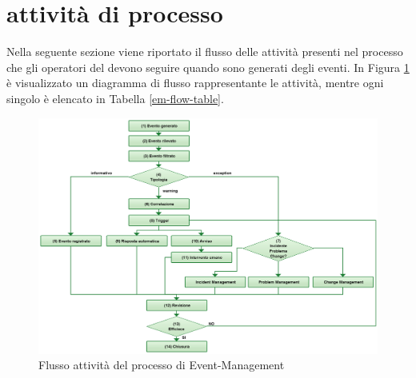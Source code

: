 %
%
\section[Attività di processo]{attività di processo}
\label{em-flow}
Nella seguente sezione viene riportato il flusso delle attività presenti nel processo che gli operatori del  devono seguire quando sono generati degli eventi. In Figura \ref{em-flow-img} è visualizzato un diagramma di flusso rappresentante le attività, mentre ogni singolo  è elencato in Tabella \ref{em-flow-table}.

\begin{figure}[htbp]
\centering
\includegraphics[scale=0.25]{Images/Diagrams/Event_Management.png}
\caption{Flusso attività del processo di \ac{Event-Management}}
\label{em-flow-img}
\end{figure}

